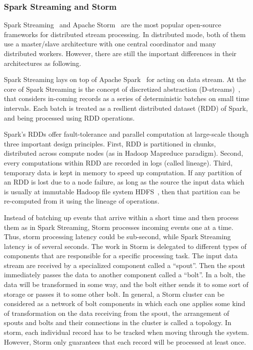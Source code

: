 \documentclass{acm_proc_article-sp}
\begin{document}
\subsubsection{Spark Streaming and Storm}

Spark Streaming~\cite{learningsparkbook,sparkstreamingweb} and Apache Storm~\cite{stormappliedbook,apachestormweb} are the most popular open-source frameworks for distributed stream processing. In distributed mode, both of them use a master/slave architecture with one central coordinator and many distributed workers. However, there are still the important differences in their architectures as following.

Spark Streaming lays on top of Apache Spark~\cite{Zaharia:2010:SCC:1863103.1863113} for acting on data stream.
 At the core of Spark Streaming is the concept of discretized abstraction (D-streams)~\cite{Zaharia:2013:DSF:2517349.2522737,Zaharia:2012:DSE:2342763.2342773}, that considers in-coming records as a series of deterministic batches on small time intervals. Each batch is treated as a resllient distributed dataset (RDD) of Spark, and being processed using RDD operations. 

 Spark's RDDs offer fault-tolerance and parallel computation at large-scale though three important design principles. First, RDD is partitioned in chunks, distributed across compute nodes (as in Hadoop Mapreduce paradigm). Second, every computations within RDD are recorded in logs (called lineage). Third, temporary data is kept in memory to speed up computation. If any partition of an RDD is lost due to a node failure, as long as the source the input data which is usually at immutable Hadoop file system HDFS~\cite{shvachko2010hadoop}, then that partition can be re-computed from it using the lineage of operations.

Instead of batching up events that arrive within a short time and then process them as in Spark Streaming, Storm processes incoming events one at a time. Thus, storm processing latency could be sub-second, while Spark Streaming latency is of several seconds. The work in Storm is delegated to different types of components that are responsible for a specific processing task. The input data stream are received by a specialized component called a ``spout''. Then the spout immediately passes the data to another component called a ``bolt''. In a bolt, the data will be transformed in some way, and the bolt either sends it to some sort of storage or passes it to some other bolt. In general, a Storm cluster can be considered as a network of bolt components in which each one applies some kind of transformation on the data receiving from the spout, the arrangement of spouts and bolts and their connections in the cluster is called a topology. In storm, each individual record has to be tracked when moving through the system. However, Storm only guarantees that each record will be processed at least once.
\end{document}

